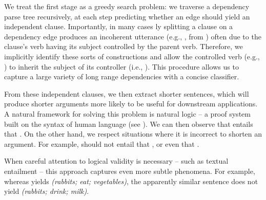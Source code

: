 We treat the first stage as a greedy search problem: we traverse
  a dependency parse tree recursively, at each step predicting whether an 
  edge should yield an independent clause.
Importantly, in many cases \naive ly splitting a clause on a dependency
  edge produces an incoherent utterance (e.g., ,
  from ) often due to the clause's verb having its subject 
  controlled by the parent verb.
Therefore, we implicitly identify these sorts of constructions
  and allow the controlled verb (e.g., ) to inherit the subject 
  of its controller (i.e., ).
This procedure allows us to capture a large variety of long range 
  dependencies with a concise classifier.
 
From these independent clauses, we then extract shorter sentences, which
  will produce shorter arguments more likely to be useful for downstream
  applications.
A natural framework for solving this problem is natural logic -- 
  a proof system built on the syntax of human language (see ).
We can then observe that
   entails that
  .
On the other hand, 
  we respect situations where it is incorrect to shorten an argument.
For example,  should not entail that
  , or even that .

When careful attention to logical validity is necessary -- such as 
  textual entailment -- this approach captures even more subtle phenomena.
For example, whereas  yields
  \textit{(rabbits; eat; vegetables)}, the apparently similar sentence
   does not yield
  \textit{(rabbits; drink; milk)}.


